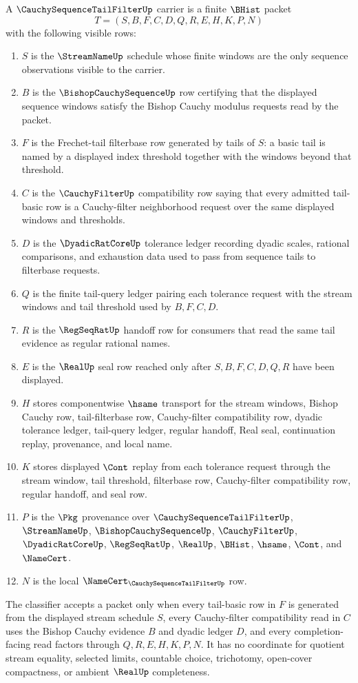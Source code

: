 \begin{definition}
\label{def:cauchy-sequence-tail-filter-carrier}
A $\CauchySequenceTailFilterUp$ carrier is a finite $\BHist$ packet
$$
T=(S,B,F,C,D,Q,R,E,H,K,P,N)
$$
with the following visible rows:
\begin{enumerate}
\item $S$ is the $\StreamNameUp$ schedule whose finite windows are the only sequence observations visible to the carrier.
\item $B$ is the $\BishopCauchySequenceUp$ row certifying that the displayed sequence windows satisfy the Bishop Cauchy modulus requests read by the packet.
\item $F$ is the Frechet-tail filterbase row generated by tails of $S$: a basic tail is named by a displayed index threshold together with the windows beyond that threshold.
\item $C$ is the $\CauchyFilterUp$ compatibility row saying that every admitted tail-basic row is a Cauchy-filter neighborhood request over the same displayed windows and thresholds.
\item $D$ is the $\DyadicRatCoreUp$ tolerance ledger recording dyadic scales, rational comparisons, and exhaustion data used to pass from sequence tails to filterbase requests.
\item $Q$ is the finite tail-query ledger pairing each tolerance request with the stream windows and tail threshold used by $B,F,C,D$.
\item $R$ is the $\RegSeqRatUp$ handoff row for consumers that read the same tail evidence as regular rational names.
\item $E$ is the $\RealUp$ seal row reached only after $S,B,F,C,D,Q,R$ have been displayed.
\item $H$ stores componentwise $\hsame$ transport for the stream windows, Bishop Cauchy row, tail-filterbase row, Cauchy-filter compatibility row, dyadic tolerance ledger, tail-query ledger, regular handoff, Real seal, continuation replay, provenance, and local name.
\item $K$ stores displayed $\Cont$ replay from each tolerance request through the stream window, tail threshold, filterbase row, Cauchy-filter compatibility row, regular handoff, and seal row.
\item $P$ is the $\Pkg$ provenance over $\CauchySequenceTailFilterUp$, $\StreamNameUp$, $\BishopCauchySequenceUp$, $\CauchyFilterUp$, $\DyadicRatCoreUp$, $\RegSeqRatUp$, $\RealUp$, $\BHist$, $\hsame$, $\Cont$, and $\NameCert$.
\item $N$ is the local $\NameCert_{\CauchySequenceTailFilterUp}$ row.
\end{enumerate}
The classifier accepts a packet only when every tail-basic row in $F$ is generated from the displayed stream schedule $S$, every Cauchy-filter compatibility read in $C$ uses the Bishop Cauchy evidence $B$ and dyadic ledger $D$, and every completion-facing read factors through $Q,R,E,H,K,P,N$. It has no coordinate for quotient stream equality, selected limits, countable choice, trichotomy, open-cover compactness, or ambient $\RealUp$ completeness.
\end{definition}
